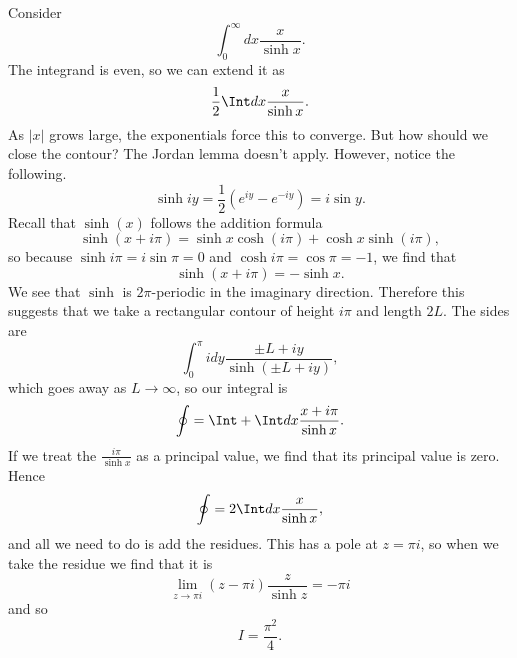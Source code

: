 \begin{exm}
    Consider
    \begin{equation}
        \int_0^\infty dx \frac{x}{\sinh x}.
    \end{equation}
    The integrand is even, so we can extend it as
    \begin{equation}
        \frac{1}{2}\Int dx \frac{x}{\sinh x}.
    \end{equation}
    As $|x|$ grows large, the exponentials force this to converge. But how should we close the contour? The Jordan lemma doesn't apply. However, notice the following.
    \begin{equation}
        \sinh iy = \frac{1}{2} (e^{iy} -e^{-iy}) = i \sin y.
    \end{equation}
    Recall that $\sinh(x)$ follows the addition formula
    \begin{equation}
        \sinh(x+i\pi) = \sinh x \cosh (i\pi) + \cosh x \sinh (i\pi),
    \end{equation}
    so because $\sinh i\pi=i\sin \pi =0$ and $\cosh i\pi = \cos \pi =-1$, we find that
    \begin{equation}
        \sinh(x+i\pi) =-\sinh x.
    \end{equation}
    We see that $\sinh$ is $2\pi$-periodic in the imaginary direction. Therefore this suggests that we take a rectangular contour of height $i\pi$ and length $2L$. The sides are
    \begin{equation}
        \int_0^\pi i dy \frac{\pm L + iy}{\sinh(\pm L +iy)},
    \end{equation}
    which goes away as $L\to \infty$, so our integral is
    \begin{equation}
        \oint = \Int + \Int dx \frac{x +i\pi}{\sinh x}.
    \end{equation}
    If we treat the $\frac{i\pi}{\sinh x}$ as a principal value, we find that its principal value is zero. Hence
    \begin{equation}
        \oint =2\Int dx \frac{x}{\sinh x},
    \end{equation}
    and all we need to do is add the residues. This has a pole at $z=\pi i$, so when we take the residue we find that it is
    \begin{equation}
        \lim_{z\to \pi i} (z-\pi i) \frac{z}{\sinh z} =-\pi i
    \end{equation}
    and so
    \begin{equation}
        I= \frac{\pi^2}{4}.
    \end{equation}
\end{exm}